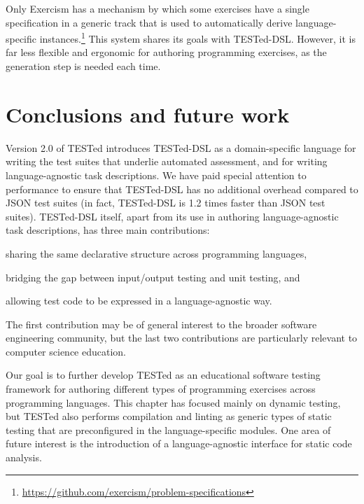\documentclass[../main]{subfiles}
\begin{document}
Only Exercism has a mechanism by which some exercises have a single specification in a generic track that is used to automatically derive language-specific instances.\footnote{\url{https://github.com/exercism/problem-specifications}}
This system shares its goals with TESTed-DSL\@.
However, it is far less flexible and ergonomic for authoring programming exercises, as the generation step is needed each time.

\section{Conclusions and future work}\label{sec:dsl-conclusion-and-future-work}

Version 2.0 of TESTed introduces TESTed-DSL as a domain-specific language for writing the test suites that underlie automated assessment, and for writing language-agnostic task descriptions.
We have paid special attention to performance to ensure that TESTed-DSL has no additional overhead compared to JSON test suites (in fact, TESTed-DSL is 1.2 times faster than JSON test suites).
TESTed-DSL itself, apart from its use in authoring language-agnostic task descriptions, has three main contributions: \begin{enumerate*}[label=\emph{\roman*})] \item sharing the same declarative structure across programming languages, \item bridging the gap between input/output testing and unit testing, and \item allowing test code to be expressed in a language-agnostic way.\end{enumerate*}
The first contribution may be of general interest to the broader software engineering community, but the last two contributions are particularly relevant to computer science education.

Our goal is to further develop TESTed as an educational software testing framework for authoring different types of programming exercises across programming languages.
This chapter has focused mainly on dynamic testing, but TESTed also performs compilation and linting as generic types of static testing that are preconfigured in the language-specific modules.
One area of future interest is the introduction of a language-agnostic interface for static code analysis.
\end{document}
